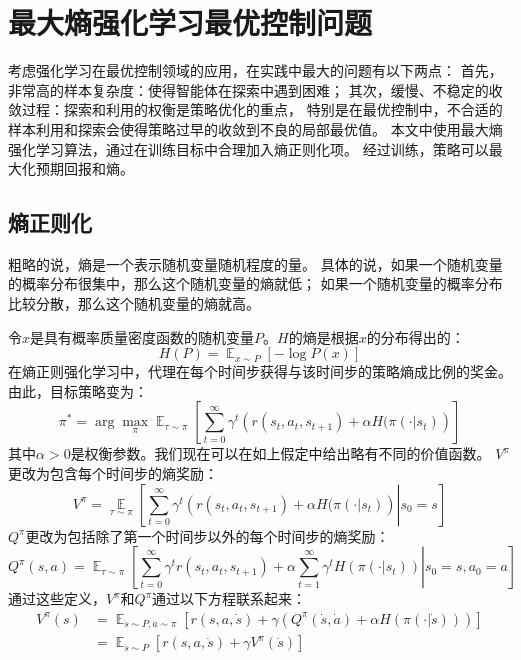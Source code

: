 \documentclass[AutoFakeBold]{LZUThesis}
\begin{document}
\section{最大熵强化学习最优控制问题}
考虑强化学习在最优控制领域的应用，在实践中最大的问题有以下两点：
首先，非常高的样本复杂度：使得智能体在探索中遇到困难；
其次，缓慢、不稳定的收敛过程：探索和利用的权衡是策略优化的重点，
特别是在最优控制中，不合适的样本利用和探索会使得策略过早的收敛到不良的局部最优值。
本文中使用最大熵强化学习算法，通过在训练目标中合理加入熵正则化项。
经过训练，策略可以最大化预期回报和熵。

\subsection{熵正则化}
粗略的说，熵是一个表示随机变量随机程度的量。
具体的说，如果一个随机变量的概率分布很集中，那么这个随机变量的熵就低；
如果一个随机变量的概率分布比较分散，那么这个随机变量的熵就高。

令$x$是具有概率质量密度函数的随机变量$P$。$H$的熵是根据$x$的分布得出的：
\begin{equation*}
  H(P) = \mathop{\mathbb{E}}_{x \sim P} \left[ - \log P(x) \right]
\end{equation*}
在熵正则强化学习中，代理在每个时间步获得与该时间步的策略熵成比例的奖金。
由此，目标策略变为：
\begin{equation}
  \pi^* = \arg \max_{\pi} \mathop{\mathbb{E}}_{\tau\sim\pi} 
  \left[ \sum_{t = 0}^{\infty} \gamma^t \left( r(s_t, a_t, s_{t + 1}) 
  + \alpha H(\pi(\cdot | s_t) \right) \right]
\end{equation}
其中$\alpha > 0$是权衡参数。我们现在可以在如上假定中给出略有不同的价值函数。
$V^{\pi}$更改为包含每个时间步的熵奖励：
\begin{equation}
  V^\pi = \mathop{\mathbb{E}}\limits_{\tau\sim\pi} 
  \left[ \sum_{t = 0}^{\infty} \gamma^t \left( r(s_t, a_t, s_{t + 1}) 
  + \alpha H(\pi(\cdot | s_t) \right) \left|\right. s_0 = s \right]
\end{equation}
$Q^\pi$更改为包括除了第一个时间步以外的每个时间步的熵奖励：
\begin{equation}
  Q^\pi(s, a) = \mathop{\mathbb{E}}_{\tau \sim \pi} \left[ \sum_{t = 0}^{\infty} \gamma^t
  r(s_t, a_t, s_{t + 1}) + \alpha \sum_{t = 1}^{\infty} \gamma^t H(\pi(\cdot | s_t))
  \left|\right. s_0 = s, a_0 = a \right]
\end{equation}
通过这些定义，$V^\pi$和$Q^\pi$通过以下方程联系起来：
\begin{equation}
  \begin{aligned}
    V^\pi(s) &= \mathop{\mathbb{E}}_{\dot s \sim P, \dot a \sim \pi}
    \left[ r(s, a, \dot s) + \gamma(Q^\pi(\dot s, \dot a) + 
    \alpha H(\pi(\cdot | \dot s))) \right] \\
	     &= \mathop{\mathbb{E}}_{\dot s \sim P}
	     \left[ r(s, a, \dot s) + \gamma V^\pi(\dot s) \right]
  \end{aligned}
\end{equation}
\end{document}
